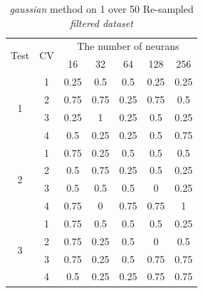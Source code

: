 \documentclass[draft,dvipsnames]{drexel-thesis}
\begin{document}
\begin{thesis}
\begin{table}[!t]
\centering
\caption{{\em gaussian} method on 1 over 50 Re-sampled {\em filtered dataset}}
\label{tbl:gaussian_1_50}
\begin{tabular}{|c|c|c|c|c|c|c|}
\hline
\multirow{2}{*}{Test} & \multirow{2}{*}{CV} & \multicolumn{5}{c|}{The number of neurans}                              \\ \cline{3-7} 
                      &                     & 16           & 32           & 64           & 128         & 256          \\ \hline
\multirow{4}{*}{1}    & 1                   & 0.25         & 0.5          & 0.5          & 0.25        & 0.25         \\ \cline{2-7} 
                      & 2                   & 0.75         & 0.75         & 0.25         & 0.75        & 0.5          \\ \cline{2-7} 
                      & 3                   & 0.25         & 1            & 0.25         & 0.5         & 0.25         \\ \cline{2-7} 
                      & 4                   & 0.5          & 0.25         & 0.25         & 0.5         & 0.75         \\ \hline
\multirow{4}{*}{2}    & 1                   & 0.75         & 0.25         & 0.5          & 0.5         & 0.5          \\ \cline{2-7} 
                      & 2                   & 0.5          & 0.75         & 0.25         & 0.5         & 0.25         \\ \cline{2-7} 
                      & 3                   & 0.5          & 0.5          & 0.5          & 0           & 0.25         \\ \cline{2-7} 
                      & 4                   & 0.75         & 0            & 0.75         & 0.75        & 1            \\ \hline
\multirow{4}{*}{3}    & 1                   & 0.75         & 0.5          & 0.5          & 0.5         & 0.25         \\ \cline{2-7} 
                      & 2                   & 0.75         & 0.25         & 0.5          & 0           & 0.5          \\ \cline{2-7} 
                      & 3                   & 0.75         & 0.25         & 0.5          & 0.75        & 0.75         \\ \cline{2-7} 
                      & 4                   & 0.5          & 0.25         & 0.25         & 0.75        & 0.75         \\ \hline

\end{tabular}
\end{table}
\end{thesis}
\end{document}
